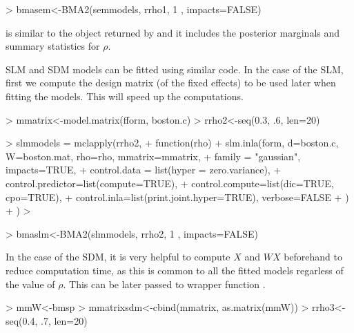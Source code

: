 \documentclass[article]{jss}
\begin{document}
\begin{Schunk}
\begin{Sinput}
> bmasem<-BMA2(semmodels, rrho1, 1 , impacts=FALSE)
\end{Sinput}
\end{Schunk}

 is similar to the object returned by  and it
includes the posterior marginals and summary statistics for $\rho$.


SLM and SDM models can be fitted using similar code. In the case of
the SLM, first we compute the design matrix (of the fixed effects) 
to be used later when fitting the models. This will speed up the 
computations.

\begin{Schunk}
\begin{Sinput}
> mmatrix<-model.matrix(fform, boston.c)
> rrho2<-seq(0.3, .6, len=20)
\end{Sinput}
\end{Schunk}

\begin{Schunk}
\begin{Sinput}
> slmmodels = mclapply(rrho2,
+         function(rho) {
+                 slm.inla(form, d=boston.c, W=boston.mat, rho=rho, mmatrix=mmatrix,
+                         family = "gaussian", impacts=TRUE,
+                         control.data = list(hyper = zero.variance),
+                         control.predictor=list(compute=TRUE),
+                         control.compute=list(dic=TRUE, cpo=TRUE),
+                         control.inla=list(print.joint.hyper=TRUE), verbose=FALSE
+                 )
+         })
> 
\end{Sinput}
\end{Schunk}

\begin{Schunk}
\begin{Sinput}
> bmaslm<-BMA2(slmmodels, rrho2, 1 , impacts=FALSE)
\end{Sinput}
\end{Schunk}

In the case of the SDM, it is very helpful to compute $X$ and $WX$ beforehand
to reduce computation time, as this is common to all the fitted models
regarless of the value of $\rho$. This can be later passed to wrapper function
.

\begin{Schunk}
\begin{Sinput}
> mmW<-bmsp%
> mmatrixsdm<-cbind(mmatrix, as.matrix(mmW))
> rrho3<-seq(0.4, .7, len=20)
\end{Sinput}
\end{Schunk}
\end{document}
